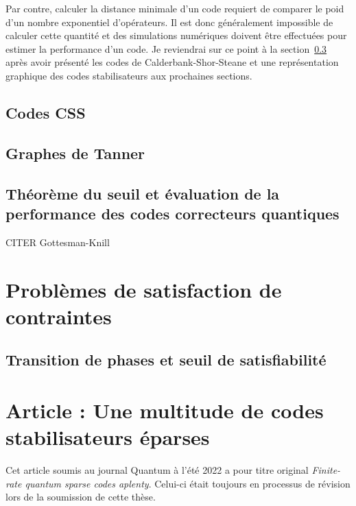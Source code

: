 Par contre,
calculer la distance minimale d'un code requiert de comparer le poid d'un
nombre exponentiel d'opérateurs.
Il est donc généralement impossible de calculer cette quantité et des simulations numériques 
doivent être effectuées pour estimer la performance d'un code.
Je reviendrai sur ce point à la section~\ref{sec:seuil_perf} après avoir présenté
les codes de Calderbank-Shor-Steane et une représentation graphique des codes
stabilisateurs aux prochaines sections.

\subsection{Codes CSS}
\subsection{Graphes de Tanner}


\subsection{Théorème du seuil et évaluation de la performance des codes correcteurs quantiques}
\label{sec:seuil_perf}
CITER Gottesman-Knill



\section{Problèmes de satisfaction de contraintes}
\subsection{Transition de phases et seuil de satisfiabilité}

\section{Article : Une multitude de codes stabilisateurs éparses}

Cet article soumis au journal Quantum à l'été 2022 a pour titre original
\textit{Finite-rate quantum sparse codes aplenty}.
Celui-ci était toujours en processus de révision lors de la soumission de cette thèse.



